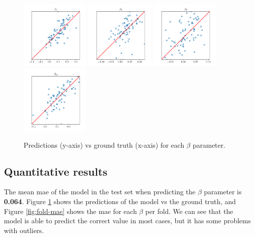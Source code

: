 \begin{figure}
	\includegraphics[width=0.3\textwidth]{files/predictions_beta/beta_7.png}
	\includegraphics[width=0.3\textwidth]{files/predictions_beta/beta_8.png}
	\includegraphics[width=0.3\textwidth]{files/predictions_beta/beta_9.png}
	\includegraphics[width=0.3\textwidth]{files/predictions_beta/beta_10.png}
	\caption[Predictions vs ground truth]{Predictions (y-axis) vs ground truth (x-axis) for each $\beta$ parameter.}
	\label{fig:scatter}
\end{figure}

\subsection{Quantitative results}

The mean \gls{mae} of the model in the test set when predicting the $\beta$
parameter is \textbf{0.064}. Figure \ref{fig:scatter} shows the predictions of
the model vs the ground truth, and Figure \ref{fig:fold-mae} shows the
\gls{mae} for each $\beta$ per fold. We can see that the model is able to
predict the correct value in most cases, but it has some problems with
outliers.

